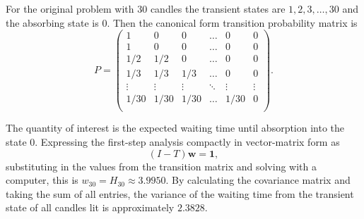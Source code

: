 \documentclass[12pt]{article}
\begin{document}
\begin{example}
    For the original problem with \( 30 \) candles the transient states
    are \( 1, 2, 3, \dots, 30 \) and the absorbing state is \( 0 \).
    Then the canonical form transition probability matrix is
    \[
        P =
        \begin{pmatrix}
            1 & 0 & 0 & \ldots & 0 & 0 \\
            1 & 0 & 0 & \ldots & 0 & 0 \\
            1/2 & 1/2 & 0 & \ldots & 0 & 0 \\
            1/3 & 1/3 & 1/3 & \ldots & 0 & 0 \\
            \vdots & \vdots & \vdots & \ddots & \vdots & \vdots \\
            1/30 & 1/30 & 1/30 & \ldots & 1/30 & 0 \\
        \end{pmatrix}
        .
    \]

    The quantity of interest is the expected waiting time until
    absorption into the state \( 0 \).  Expressing the first-step
    analysis compactly in vector-matrix form as
    \[
        (I - T) \mathbf{w} = \mathbf{1},
    \] substituting in the values from the transition matrix and solving
    with a computer, this is \( w_{30} = H_{30} \approx 3.9950 \).  By
    calculating the covariance matrix and taking the sum of all entries,
    the variance of the waiting time from the transient state of all
    candles lit is approximately \( 2.3828 \).
\end{example}
\end{document}
